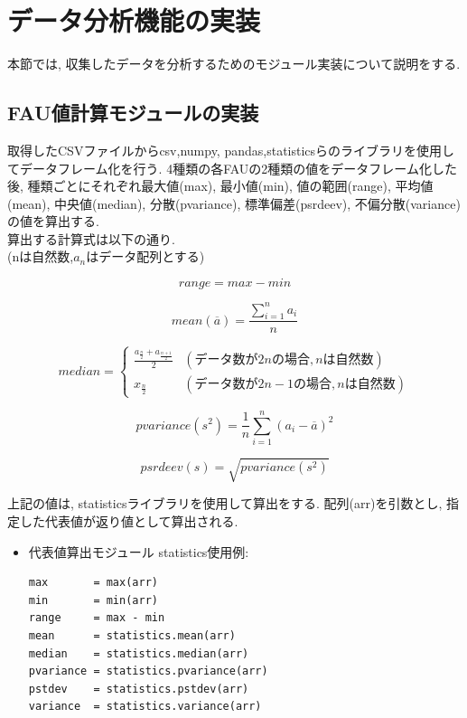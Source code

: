 \section{データ分析機能の実装}
本節では, 収集したデータを分析するためのモジュール実装について説明をする.
\subsection{FAU値計算モジュールの実装}
取得したCSVファイルからcsv,numpy, pandas,statisticsらのライブラリを使用してデータフレーム化を行う.
4種類の各FAUの2種類の値をデータフレーム化した後, 種類ごとにそれぞれ最大値(max), 最小値(min), 値の範囲(range), 平均値(mean), 中央値(median), 分散(pvariance), 標準偏差(psrdeev), 不偏分散(variance)の値を算出する.\\
算出する計算式は以下の通り.\\
(nは自然数,$a_{n}$はデータ配列とする)

\begin{equation}
\label{range}
range  = max - min
\end{equation}

\begin{equation}
\label{mean}
mean( \overline{a})  =  \frac{\sum_{i=1}^n a_i}{n}
\end{equation}

  \begin{equation}
    \label{median}
    median = \left\{ \begin{array}{ll}
    \frac{a_\frac{n}{2} + a_\frac{n+1}{2} }{2} & (データ数が2nの場合,nは自然数) \\
    x_\frac{n}{2} & (データ数が2n-1の場合,nは自然数)
    \end{array} \right.\end{equation}

\begin{equation}
\label{pvariance}
pvariance(s^2)  =  \frac{1}{n} \sum_{i=1}^n (a_i - \overline{a})^2
\end{equation}


\begin{equation}
\label{pvariance}
psrdeev(s)  =  \sqrt{pvariance(s^2)}
\end{equation}

上記の値は, statisticsライブラリを使用して算出をする.
配列(arr)を引数とし, 指定した代表値が返り値として算出される.

\begin{itemize}
\item 代表値算出モジュール statistics使用例:
\begin{lstlisting}
max       = max(arr)
min       = min(arr)
range     = max - min
mean      = statistics.mean(arr)
median    = statistics.median(arr)
pvariance = statistics.pvariance(arr)
pstdev    = statistics.pstdev(arr)
variance  = statistics.variance(arr)
\end{lstlisting}
\end{itemize}

